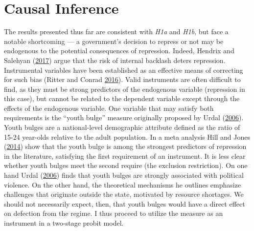 \documentclass[12pt,]{article}
\theoremstyle{definition}
\theoremstyle{definition}
\theoremstyle{definition}
\theoremstyle{remark}
\begin{document}
\singlespacing



\doublespacing

\hypertarget{causal-inference}{%
\section{Causal Inference}\label{causal-inference}}

The results presented thus far are consistent with \emph{H1a} and
\emph{H1b}, but face a notable shortcoming --- a government's decision
to repress or not may be endogenous to the potential consequences of
repression. Indeed, Hendrix and Salehyan
(\protect\hyperlink{ref-Hendrix2017}{2017}) argue that the risk of
internal backlash deters repression. Instrumental variables have been
established as an effective means of correcting for such bias (Ritter
and Conrad \protect\hyperlink{ref-Ritter2016}{2016}). Valid instruments
are often difficult to find, as they must be strong predictors of the
endogenous variable (repression in this case), but cannot be related to
the dependent variable except through the effects of the endogenous
variable. One variable that may satisfy both requirements is the ``youth
bulge'' measure originally proposed by Urdal
(\protect\hyperlink{ref-Urdal2006}{2006}). Youth bulges are a
national-level demographic attribute defined as the ratio of 15-24
year-olds relative to the adult population. In a meta analysis Hill and
Jones (\protect\hyperlink{ref-Hill2014}{2014}) show that the youth bulge
is among the strongest predictors of repression in the literature,
satisfying the first requirement of an instrument. It is less clear
whether youth bulges meet the second require (the exclusion
restriction). On one hand Urdal
(\protect\hyperlink{ref-Urdal2006}{2006}) finds that youth bulges are
strongly associated with political violence. On the other hand, the
theoretical mechanisms he outlines emphasize challenges that originate
outside the state, motivated by resource shortages. We should not
necessarily expect, then, that youth bulges would have a direct effect
on defection from the regime. I thus proceed to utilize the measure as
an instrument in a two-stage probit model.

\singlespacing



\doublespacing
\end{document}
